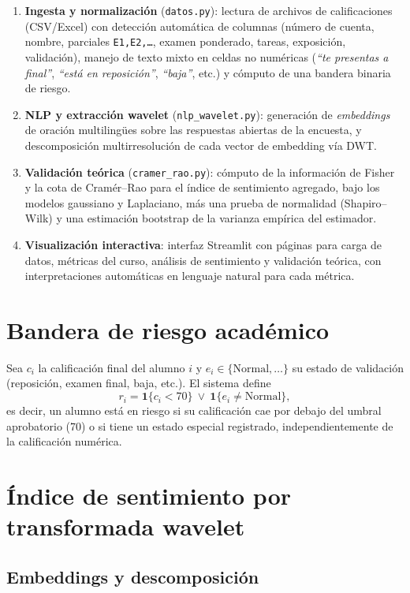 \documentclass[11pt,a4paper,oneside]{article}
\theoremstyle{definition}
\begin{document}
\begin{enumerate}[leftmargin=1.4em]
  \item \textbf{Ingesta y normalización} (\texttt{datos.py}): lectura de archivos de
  calificaciones (CSV/Excel) con detección automática de columnas (número de cuenta, nombre,
  parciales \texttt{E1,E2,\dots}, examen ponderado, tareas, exposición, validación), manejo de
  texto mixto en celdas no numéricas (\emph{``te presentas a final''}, \emph{``está en
  reposición''}, \emph{``baja''}, etc.) y cómputo de una bandera binaria de riesgo.
  \item \textbf{NLP y extracción wavelet} (\texttt{nlp\_wavelet.py}): generación de
  \emph{embeddings} de oración multilingües sobre las respuestas abiertas de la encuesta, y
  descomposición multirresolución de cada vector de embedding vía DWT.
  \item \textbf{Validación teórica} (\texttt{cramer\_rao.py}): cómputo de la información de
  Fisher y la cota de Cramér--Rao para el índice de sentimiento agregado, bajo los modelos
  gaussiano y Laplaciano, más una prueba de normalidad (Shapiro--Wilk) y una estimación
  bootstrap de la varianza empírica del estimador.
  \item \textbf{Visualización interactiva}: interfaz Streamlit con páginas para carga de datos,
  métricas del curso, análisis de sentimiento y validación teórica, con interpretaciones
  automáticas en lenguaje natural para cada métrica.
\end{enumerate}

\section{Bandera de riesgo académico}

Sea $c_i$ la calificación final del alumno $i$ y $e_i\in\{\text{Normal},\ldots\}$ su estado de
validación (reposición, examen final, baja, etc.). El sistema define
\[
r_i = \mathbf{1}\{c_i < 70\} \ \vee\ \mathbf{1}\{e_i \neq \text{Normal}\},
\]
es decir, un alumno está en riesgo si su calificación cae por debajo del umbral aprobatorio
(70) o si tiene un estado especial registrado, independientemente de la calificación numérica.

\section{Índice de sentimiento por transformada wavelet}

\subsection{Embeddings y descomposición}
\end{document}
